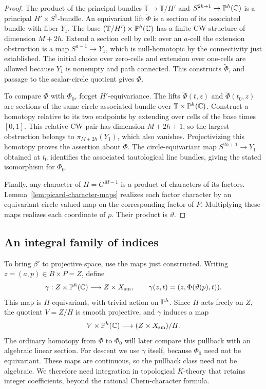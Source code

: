 \begin{proof}
The product of the principal bundles
\(\mathbb T\to\mathbb T/H'\) and
\(S^{2h+1}\to\mathbb P^h(\mathbb C)\) is a principal \(H'\times S^1\)-bundle.
An equivariant lift \(\widetilde\Phi\) is a section of its associated
bundle with fiber \(Y_1\).  The base
\((\mathbb T/H')\times\mathbb P^h(\mathbb C)\) has a finite CW structure of dimension
\(M+2h\).  Extend a section cell by cell: over an \(a\)-cell the
extension obstruction is a map \(S^{a-1}\to Y_1\), which is
null-homotopic by the connectivity just established.  The initial
choice over zero-cells and extension over one-cells are allowed
because \(Y_1\) is nonempty and path connected.  This constructs
\(\widetilde\Phi\), and passage to the scalar-circle quotient gives \(\Phi\).

To compare \(\Phi\) with \(\Phi_0\), forget \(H'\)-equivariance.
The lifts \(\widetilde\Phi(t,z)\) and \(\widetilde\Phi(t_0,z)\) are sections
of the same circle-associated bundle over
\(\mathbb T\times\mathbb P^h(\mathbb C)\).  Construct a homotopy relative to its
two endpoints by extending over cells of the base times \([0,1]\).
This relative CW pair has dimension \(M+2h+1\), so the largest
obstruction belongs to \(\pi_{M+2h}(Y_1)\), which also vanishes.
Projectivizing this homotopy proves the assertion about \(\Phi\).
The circle-equivariant map
\(S^{2h+1}\to Y_1\) obtained at \(t_0\) identifies the associated
tautological line bundles, giving the stated isomorphism for \(\Phi_0\).

Finally, any character of \(H=G^{M-1}\) is a product of characters of
its factors.  Lemma~\ref{lem:picard-character-maps} realizes each
factor character by an equivariant circle-valued map on the
corresponding factor of \(P\).  Multiplying these maps realizes each
coordinate of \(\rho\).  Their product is \(\vartheta\).
\end{proof}

\subsection{An integral family of indices}

To bring \(\beta'\) to projective space, use the maps just constructed.
Writing \(z=(a,p)\in B\times P=Z\), define
\[
 \gamma:Z\times\mathbb P^h(\mathbb C)\longrightarrow Z\times X_{\mathrm{sm}},
 \qquad
 \gamma(z,t)=(z,\Phi(\vartheta(p),t)).
\]
This map is \(H\)-equivariant, with trivial action on \(\mathbb P^h\).
Since \(H\) acts freely on \(Z\), the quotient \(V=Z/H\) is smooth
projective, and \(\gamma\) induces a map
\[
 V\times\mathbb P^h(\mathbb C)\longrightarrow (Z\times X_{\mathrm{sm}})/H.
\]
The ordinary homotopy from \(\Phi\) to \(\Phi_0\) will later compare
this pullback with an algebraic linear section.  For descent we use
\(\gamma\) itself, because \(\Phi_0\) need not be equivariant.
These maps are continuous, so the pullback class need not be algebraic.
We therefore need integration in topological \(K\)-theory that retains
integer coefficients, beyond the rational Chern-character formula.

